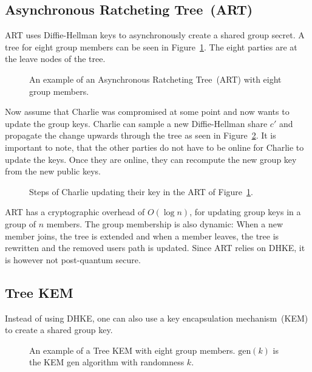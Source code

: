 \subsection{Asynchronous Ratcheting Tree~(ART)}
ART \cite{EPRINT:CCGMM17} uses Diffie-Hellman keys to asynchronously create a shared group secret.
A tree for eight group members can be seen in Figure~\ref{fig:art:art}.
The eight parties are at the leave nodes of the tree.

\begin{figure}[!ht]
    \centering
    
    \caption{An example of an Asynchronous Ratcheting Tree~(ART) with eight group members.}
    \label{fig:art:art}
\end{figure}

Now assume that Charlie was compromised at some point and now wants to update the group keys.
Charlie can sample a new Diffie-Hellman share $c'$ and propagate the change upwards through the tree as seen in Figure~\ref{fig:art:art_update}.
It is important to note, that the other parties do not have to be online for Charlie to update the keys.
Once they are online, they can recompute the new group key from the new public keys.

\begin{figure}[!ht]
    \centering
    
    \caption{Steps of Charlie updating their key in the ART of Figure~\ref{fig:art:art}.}
    \label{fig:art:art_update}
\end{figure}

ART has a cryptographic overhead of $O(\log n)$, for updating group keys in a group of $n$ members.
The group membership is also dynamic: When a new member joins, the tree is extended and when a member leaves, the tree is rewritten and the removed users path is updated.
Since ART relies on DHKE, it is however not post-quantum secure.

\subsection{Tree KEM}
Instead of using DHKE, one can also use a key encapsulation mechanism~(KEM) to create a shared group key.

\begin{figure}[!ht]
    \centering
    
    \caption{An example of a Tree KEM with eight group members. $\mathrm{gen}(k)$ is the KEM gen algorithm with randomness $k$.}
    \label{fig:art:art_kem}
\end{figure}

